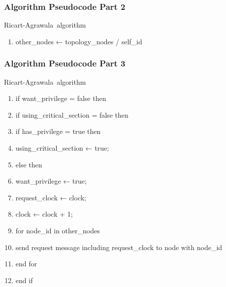 \documentclass[11pt]{beamer}              %
\begin{document}
\begin{frame}
\frametitle{Algorithm Pseudocode Part 2}

\begin{center}
\begin{algorithm}[H]
	\scriptsize
	\def\algorithmlabel{Ricart-Agrawala}
    \caption{\algorithmlabel\ algorithm}
    \label{alg:ricart_agrawala}
    \begin{algorithmic}[1]
            \begin{enumerate}
                \item other\_nodes ← topology\_nodes / self\_id
            \end{enumerate}
    \end{algorithmic}
\end{algorithm}
\end{center}
\end{frame}

\begin{frame}
\frametitle{Algorithm Pseudocode Part 3}

\begin{center}
\begin{algorithm}[H]
	\scriptsize
	\def\algorithmlabel{Ricart-Agrawala}
    \caption{\algorithmlabel\ algorithm}
    \label{alg:ricart_agrawala}
    \begin{algorithmic}[1]
            \begin{enumerate}
                \item if want\_privilege = false then
                \item \quad if using\_critical\_section = false then
                \item \quad \quad if has\_privilege = true then
                \item \quad \quad \quad using\_critical\_section ← true;
                \item \quad \quad else then
                \item \quad \quad \quad want\_privilege ← true;
                \item \quad \quad \quad request\_clock ← clock;
                \item \quad \quad \quad clock ← clock + 1;
                \item \quad \quad \quad for node\_id in other\_nodes
                \item \quad \quad \quad send request message including request\_clock to node with node\_id
                \item \quad \quad end for
                \item \quad end if
            \end{enumerate}
    \end{algorithmic}
\end{algorithm}
\end{center}
\end{frame}
\end{document}

